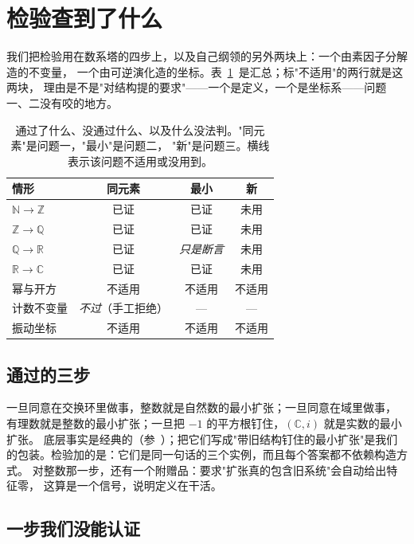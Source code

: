 \documentclass[aps,prd,preprint,superscriptaddress,amsmath,amssymb]{revtex4-2}
\begin{document}
\section{检验查到了什么}
\label{sec:found}

我们把检验用在数系塔的四步上，以及自己纲领的另外两块上：一个由素因子分解造的不变量，
一个由可逆演化造的坐标。表~\ref{tab:results}~是汇总；标"不适用"的两行就是这两块，
理由是不是"对结构提的要求"——一个是定义，一个是坐标系——问题一、二没有咬的地方。

\begin{table}[t]
\caption{通过了什么、没通过什么、以及什么没法判。"同元素"是问题一，"最小"是问题二，
"新"是问题三。横线表示该问题不适用或没用到。}
\label{tab:results}
\begin{ruledtabular}
\begin{tabular}{lccc}
情形 & 同元素 & 最小 & 新 \\
\hline
$\mathbb{N}\to\mathbb{Z}$ & 已证 & 已证 & 未用 \\
$\mathbb{Z}\to\mathbb{Q}$ & 已证 & 已证 & 未用 \\
$\mathbb{Q}\to\mathbb{R}$ & 已证 & \emph{只是断言} & 未用 \\
$\mathbb{R}\to\mathbb{C}$ & 已证 & 已证 & 未用 \\
幂与开方 & 不适用 & 不适用 & 不适用 \\
计数不变量 & \emph{不过}（手工拒绝） & --- & --- \\
振动坐标 & 不适用 & 不适用 & 不适用 \\
\end{tabular}
\end{ruledtabular}
\end{table}

\subsection{通过的三步}
\label{sec:tower}

一旦同意在交换环里做事，整数就是自然数的最小扩张；一旦同意在域里做事，
有理数就是整数的最小扩张；一旦把 $-1$ 的平方根钉住，$(\mathbb{C},i)$ 就是实数的最小扩张。
底层事实是经典的（参~\cite{ebb}）；把它们写成"带旧结构钉住的最小扩张"是我们的包装。检验加的是：它们是同一句话的三个实例，而且每个答案都不依赖构造方式。
对整数那一步，还有一个附赠品：要求"扩张真的包含旧系统"会自动给出特征零，
这算是一个信号，说明定义在干活。

\subsection{一步我们没能认证}
\label{sec:real}
\end{document}
